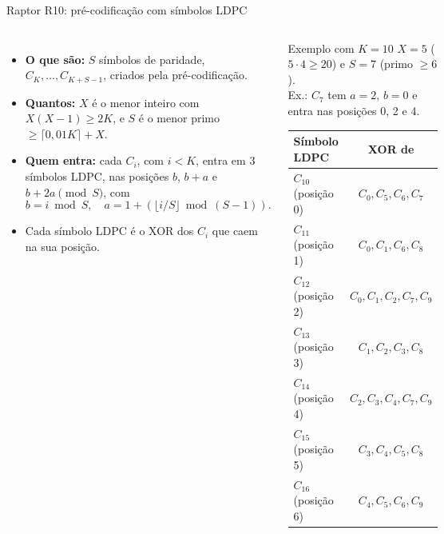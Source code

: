 \documentclass[aspectratio=169,10pt]{beamer}
\begin{document}
\begin{frame}{Raptor R10: pré-codificação com símbolos LDPC}
	\begin{columns}[T, onlytextwidth]
		\begin{itemize}\setlength{\itemsep}{0.35em}
			\item \textbf{O que são:} $S$ símbolos de \alert{paridade}, $C_K, \ldots, C_{K+S-1}$, criados pela pré-codificação.
			\item \textbf{Quantos:} $X$ é o menor inteiro com $X(X-1) \ge 2K$, e $S$ é o menor primo $\ge \lceil 0{,}01K \rceil + X$.
			\item \textbf{Quem entra:} cada $C_i$, com $i < K$, entra em \alert{3} símbolos LDPC, nas posições $b$, $b + a$ e $b + 2a \pmod S$, com
			\[ b = i \bmod S, \quad a = 1 + (\lfloor i/S \rfloor \bmod (S - 1)). \]
			\item Cada símbolo LDPC é o XOR dos $C_i$ que caem na sua posição.
		\end{itemize}
		\begin{block}{Exemplo com $K = 10$}
			\small
			$X = 5$ ($5 \cdot 4 \ge 20$) e $S = 7$ (primo $\ge 6$).\\
			Ex.: $C_7$ tem $a = 2$, $b = 0$ e entra nas posições 0, 2 e 4.
			\par\vspace{0.4em}
			\centering
			\footnotesize
			\renewcommand{\arraystretch}{1.05}
			\begin{tabular}{@{}lc@{}}
				\textbf{Símbolo LDPC} & \textbf{XOR de} \\
				\midrule
				$C_{10}$ (posição 0) & $C_0, C_5, C_6, C_7$ \\
				$C_{11}$ (posição 1) & $C_0, C_1, C_6, C_8$ \\
				$C_{12}$ (posição 2) & $C_0, C_1, C_2, C_7, C_9$ \\
				$C_{13}$ (posição 3) & $C_1, C_2, C_3, C_8$ \\
				$C_{14}$ (posição 4) & $C_2, C_3, C_4, C_7, C_9$ \\
				$C_{15}$ (posição 5) & $C_3, C_4, C_5, C_8$ \\
				$C_{16}$ (posição 6) & $C_4, C_5, C_6, C_9$ \\
			\end{tabular}
		\end{block}
	\end{columns}
\end{frame}
\end{document}
